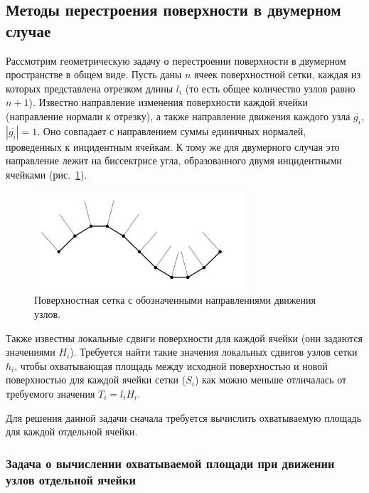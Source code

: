 \subsection{Методы перестроения поверхности в двумерном случае}

Рассмотрим геометрическую задачу о перестроении поверхности в двумерном пространстве в общем виде.
Пусть даны $n$ ячеек поверхностной сетки, каждая из которых представлена отрезком длины $l_i$ (то есть общее количество узлов равно $n + 1$).
Известно направление изменения поверхности каждой ячейки (направление нормали к отрезку), а также направление движения каждого узла $\overline{g_i}$, $|\overline{g_i}| = 1$.
Оно совпадает с направлением суммы единичных нормалей, проведенных к инцидентным ячейкам.
К тому же для двумерного случая это направление лежит на биссектрисе угла, образованного двумя инцидентными ячейками \cite{Fortin2004Remesh2d} (рис.~\ref{fig:text_1_remesh_2d_grid_normals}).

\begin{figure}[h]
\onelinecaptionstrue
\centering
\includegraphics[width=0.7\textwidth]{pics/text_1_remesh_2d/grid_normals.pdf}
\caption{Поверхностная сетка с обозначенными направлениями движения узлов.}
\label{fig:text_1_remesh_2d_grid_normals}
\end{figure}

Также известны локальные сдвиги поверхности для каждой ячейки (они задаются значениями $H_i$).
Требуется найти такие значения локальных сдвигов узлов сетки $h_i$, чтобы охватывающая площадь между исходной поверхностью и новой поверхностью для каждой ячейки сетки ($S_i$) как можно меньше отличалась от требуемого значения $T_i = l_iH_i$.

Для решения данной задачи сначала требуется вычислить охватываемую площадь для каждой отдельной ячейки.

\subsubsection{Задача о вычислении охватываемой площади при движении узлов отдельной ячейки}

